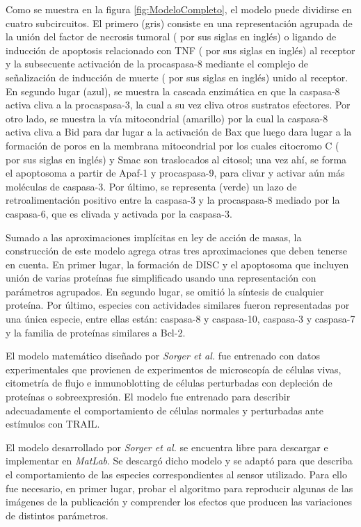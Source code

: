 Como se muestra en la figura \ref{fig:ModeloCompleto}, el modelo puede dividirse en cuatro subcircuitos. El primero (gris) consiste en una representación agrupada de la unión del factor de necrosis tumoral ( por sus siglas en inglés) o ligando de inducción de apoptosis relacionado con TNF ( por sus siglas en inglés) al receptor y la subsecuente activación de la procaspasa-8 mediante el complejo de señalización de inducción de muerte ( por sus siglas en inglés) unido al receptor. En segundo lugar (azul), se muestra la cascada enzimática en que la caspasa-8 activa cliva a la procaspasa-3, la cual a su vez cliva otros sustratos efectores. Por otro lado, se muestra la vía mitocondrial (amarillo) por la cual la caspasa-8 activa cliva a Bid para dar lugar a la activación de Bax que luego dara lugar a la formación de poros en la membrana mitocondrial por los cuales citocromo C ( por sus siglas en inglés) y Smac son traslocados al citosol; una vez ahí, se forma el apoptosoma a partir de Apaf-1 y procaspasa-9, para clivar y activar aún más moléculas de caspasa-3. Por último, se representa (verde) un lazo de retroalimentación positivo entre la caspasa-3 y la procaspasa-8 mediado por la caspasa-6, que es clivada y activada por la caspasa-3\cite{Sorger2008}.

Sumado a las aproximaciones implícitas en ley de acción de masas, la construcción de este modelo agrega otras tres aproximaciones que deben tenerse en cuenta. En primer lugar, la formación de DISC y el apoptosoma que incluyen unión de varias proteínas fue simplificado usando una representación con parámetros agrupados. En segundo lugar, se omitió la síntesis de cualquier proteína. Por último, especies con actividades similares fueron representadas por una única especie, entre ellas están: caspasa-8 y caspasa-10, caspasa-3 y caspasa-7 y la familia de proteínas similares a Bcl-2\cite{Sorger2008}.

El modelo matemático diseñado por \textit{Sorger et al.} fue entrenado con datos experimentales que provienen de experimentos de microscopía de células vivas, citometría de flujo e inmunoblotting de células perturbadas con depleción de proteínas o sobreexpresión. El modelo fue entrenado para describir adecuadamente el comportamiento de células normales y perturbadas ante estímulos con TRAIL\cite{Sorger2008}.

El modelo desarrollado por \textit{Sorger et al.} se encuentra libre para descargar e implementar en \textit{MatLab}. Se descargó dicho modelo y se adaptó para que describa el comportamiento de las especies correspondientes al sensor utilizado. Para ello fue necesario, en primer lugar, probar el algoritmo para reproducir algunas de las imágenes de la publicación y comprender los efectos que producen las variaciones de distintos parámetros.


